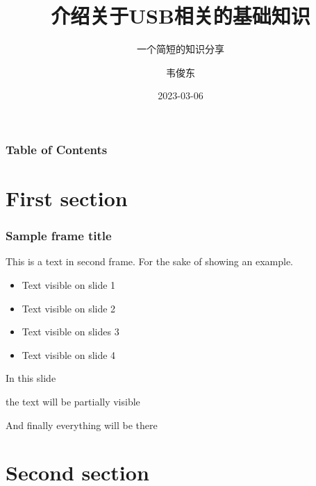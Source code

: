 \documentclass{beamer}
\title[USB 协议介绍]{介绍关于USB相关的基础知识}
\subtitle{一个简短的知识分享}
\author{韦俊东}
\date{2023-03-06}
\begin{document}
\frame{\titlepage}

\begin{frame}
    \frametitle{Table of Contents}
    \tableofcontents
\end{frame}


\section{First section}

\begin{frame}
    \frametitle{Sample frame title}
    This is a text in second frame. For the sake of showing an example.

    \begin{itemize}
        \item<1-> Text visible on slide 1
        \item<2-> Text visible on slide 2
        \item<3> Text visible on slides 3
        \item<4-> Text visible on slide 4
    \end{itemize}
\end{frame}



\begin{frame}
    In this slide \pause

    the text will be partially visible \pause

    And finally everything will be there
\end{frame}

\section{Second section}
\end{document}
